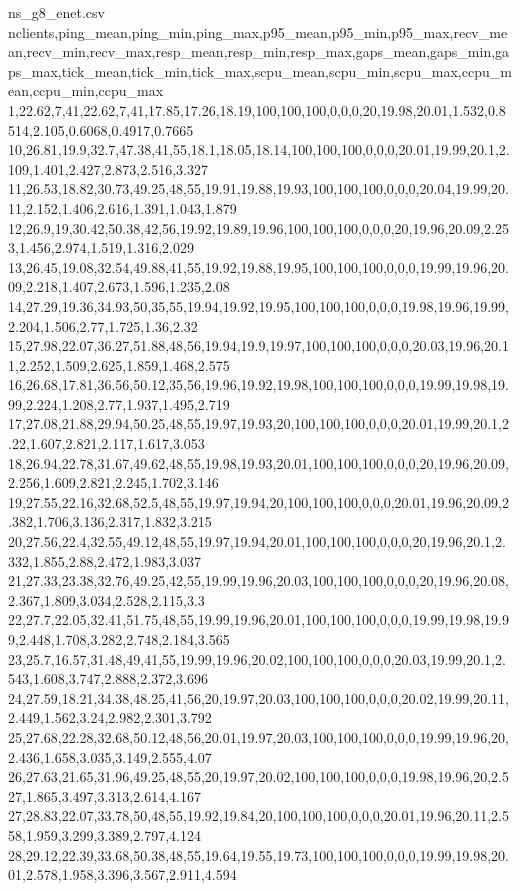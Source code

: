 \begin{filecontents*}[overwrite]{ns_g8_enet.csv}
nclients,ping_mean,ping_min,ping_max,p95_mean,p95_min,p95_max,recv_mean,recv_min,recv_max,resp_mean,resp_min,resp_max,gaps_mean,gaps_min,gaps_max,tick_mean,tick_min,tick_max,scpu_mean,scpu_min,scpu_max,ccpu_mean,ccpu_min,ccpu_max
1,22.62,7,41,22.62,7,41,17.85,17.26,18.19,100,100,100,0,0,0,20,19.98,20.01,1.532,0.8514,2.105,0.6068,0.4917,0.7665
10,26.81,19.9,32.7,47.38,41,55,18.1,18.05,18.14,100,100,100,0,0,0,20.01,19.99,20.1,2.109,1.401,2.427,2.873,2.516,3.327
11,26.53,18.82,30.73,49.25,48,55,19.91,19.88,19.93,100,100,100,0,0,0,20.04,19.99,20.11,2.152,1.406,2.616,1.391,1.043,1.879
12,26.9,19,30.42,50.38,42,56,19.92,19.89,19.96,100,100,100,0,0,0,20,19.96,20.09,2.253,1.456,2.974,1.519,1.316,2.029
13,26.45,19.08,32.54,49.88,41,55,19.92,19.88,19.95,100,100,100,0,0,0,19.99,19.96,20.09,2.218,1.407,2.673,1.596,1.235,2.08
14,27.29,19.36,34.93,50,35,55,19.94,19.92,19.95,100,100,100,0,0,0,19.98,19.96,19.99,2.204,1.506,2.77,1.725,1.36,2.32
15,27.98,22.07,36.27,51.88,48,56,19.94,19.9,19.97,100,100,100,0,0,0,20.03,19.96,20.11,2.252,1.509,2.625,1.859,1.468,2.575
16,26.68,17.81,36.56,50.12,35,56,19.96,19.92,19.98,100,100,100,0,0,0,19.99,19.98,19.99,2.224,1.208,2.77,1.937,1.495,2.719
17,27.08,21.88,29.94,50.25,48,55,19.97,19.93,20,100,100,100,0,0,0,20.01,19.99,20.1,2.22,1.607,2.821,2.117,1.617,3.053
18,26.94,22.78,31.67,49.62,48,55,19.98,19.93,20.01,100,100,100,0,0,0,20,19.96,20.09,2.256,1.609,2.821,2.245,1.702,3.146
19,27.55,22.16,32.68,52.5,48,55,19.97,19.94,20,100,100,100,0,0,0,20.01,19.96,20.09,2.382,1.706,3.136,2.317,1.832,3.215
20,27.56,22.4,32.55,49.12,48,55,19.97,19.94,20.01,100,100,100,0,0,0,20,19.96,20.1,2.332,1.855,2.88,2.472,1.983,3.037
21,27.33,23.38,32.76,49.25,42,55,19.99,19.96,20.03,100,100,100,0,0,0,20,19.96,20.08,2.367,1.809,3.034,2.528,2.115,3.3
22,27.7,22.05,32.41,51.75,48,55,19.99,19.96,20.01,100,100,100,0,0,0,19.99,19.98,19.99,2.448,1.708,3.282,2.748,2.184,3.565
23,25.7,16.57,31.48,49,41,55,19.99,19.96,20.02,100,100,100,0,0,0,20.03,19.99,20.1,2.543,1.608,3.747,2.888,2.372,3.696
24,27.59,18.21,34.38,48.25,41,56,20,19.97,20.03,100,100,100,0,0,0,20.02,19.99,20.11,2.449,1.562,3.24,2.982,2.301,3.792
25,27.68,22.28,32.68,50.12,48,56,20.01,19.97,20.03,100,100,100,0,0,0,19.99,19.96,20,2.436,1.658,3.035,3.149,2.555,4.07
26,27.63,21.65,31.96,49.25,48,55,20,19.97,20.02,100,100,100,0,0,0,19.98,19.96,20,2.527,1.865,3.497,3.313,2.614,4.167
27,28.83,22.07,33.78,50,48,55,19.92,19.84,20,100,100,100,0,0,0,20.01,19.96,20.11,2.558,1.959,3.299,3.389,2.797,4.124
28,29.12,22.39,33.68,50.38,48,55,19.64,19.55,19.73,100,100,100,0,0,0,19.99,19.98,20.01,2.578,1.958,3.396,3.567,2.911,4.594

\end{filecontents*}
